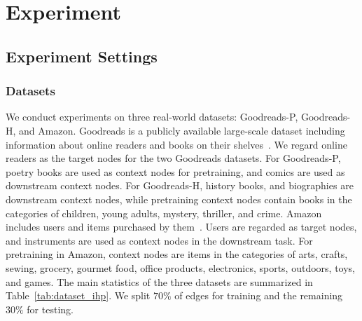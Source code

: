 \section{Experiment}

\subsection{Experiment Settings}
\subsubsection{Datasets}     


We conduct experiments on three real-world datasets: Goodreads-P,  Goodreads-H, and Amazon. 
Goodreads is a publicly available large-scale dataset including information about online readers and books on their shelves~\cite{dataset:goodreads}. 
We regard online readers as the target nodes for the two Goodreads datasets. For Goodreads-P, poetry books are used as context nodes for pretraining, and comics are used as downstream context nodes.  
For Goodreads-H, history books, and biographies are downstream context nodes, while pretraining context nodes contain books in the categories of children, young adults, mystery, thriller, and crime. 
Amazon includes users and items purchased by them~\cite{dataset:amazon}. Users are regarded as target nodes, and instruments are used as context nodes in the downstream task. 
For pretraining in Amazon, context nodes are items in the categories of arts, crafts, sewing, grocery, gourmet food, office products, electronics, sports, outdoors, toys, and games. 
The main statistics of the three datasets are summarized in Table~\ref{tab:dataset_ihp}.
We split $70\%$ of edges for training and the remaining $30\%$ for testing.

